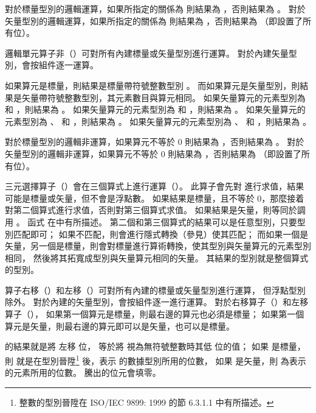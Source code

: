 {對於標量型別的邏輯運算，如果所指定的關係為  則結果為 ，否則結果為 。
對於矢量型別的邏輯運算，如果所指定的關係為  則結果為 ，否則結果為  （即設置了所有位）。
\stopitem

\startitem
邏輯單元算子非（\ccmm{!}）可對所有內建標量或矢量型別進行運算。
對於內建矢量型別，會按組件逐一運算。

如果算元是標量，則結果是標量帶符號整數型別 。
而如果算元是矢量型別，則結果是矢量帶符號整數型別，其元素數目與算元相同。
如果矢量算元的元素型別為  和 ，則結果為 。
如果矢量算元的元素型別為  和 ，則結果為 。
如果矢量算元的元素型別為 、  和 ，則結果為 。
如果矢量算元的元素型別為 、  和 ，則結果為 。

對於標量型別的邏輯非運算，如果算元不等於 0 則結果為 ，否則結果為 。
對於矢量型別的邏輯非運算，如果算元不等於 0 則結果為 ，否則結果為  （即設置了所有位）。
\stopitem

\startitem
三元選擇算子（）會在三個算式上進行運算（）。
此算子會先對  進行求值，結果可能是標量或矢量，但不會是浮點數。
如果結果是標量，且不等於 0，那麼接着對第二個算式進行求值，否則對第三個算式求值。
如果結果是矢量，則等同於調用 。
函式  在中有所描述。
第二個和第三個算式的結果可以是任意型別，只要型別匹配即可；
如果不匹配，則會進行隱式轉換（參見）使其匹配；
而如果一個是矢量，另一個是標量，則會對標量進行算術轉換，使其型別與矢量算元的元素型別相同，
然後將其拓寬成型別與矢量算元相同的矢量。
其結果的型別就是整個算式的型別。
\stopitem

\startitem
算子右移（\ccmm{>>}）和左移（\ccmm{<<}）可對所有內建的標量或矢量型別進行運算，
但浮點型別除外。
對於內建的矢量型別，會按組件逐一進行運算。
對於右移算子（\ccmm{>>}）和左移算子（\ccmm{<<}），
如果第一個算元是標量，則最右邊的算元也必須是標量；
如果第一個算元是矢量，則最右邊的算元即可以是矢量，也可以是標量。

 的結果就是將  左移  位，
  等於將  視為無符號整數時其低  位的值；
如果  是標量，則  就是在型別晉陞\footnote{
整數的型別晉陞在 ISO/IEC 9899: 1999 的節 6.3.1.1 中有所描述。}
後，表示  的數據型別所用的位數，
如果  是矢量，則  為表示  的元素所用的位數。
騰出的位元會填零。

}
